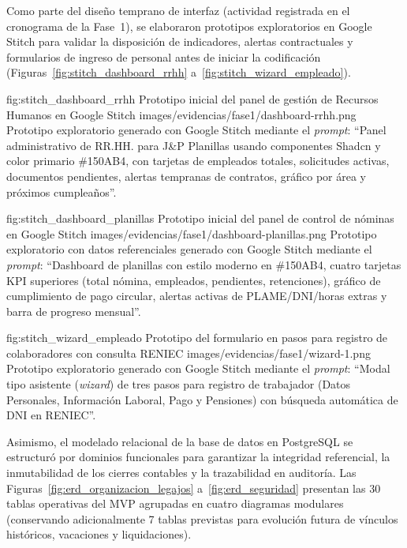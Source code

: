 Como parte del diseño temprano de interfaz (actividad registrada en el cronograma de la Fase~1), 
se elaboraron prototipos exploratorios en Google Stitch para validar la disposición de indicadores, 
alertas contractuales y formularios de ingreso de personal antes de iniciar la codificación 
(Figuras~\ref{fig:stitch_dashboard_rrhh} a~\ref{fig:stitch_wizard_empleado}).

\figuraEnTexto
    {fig:stitch_dashboard_rrhh}
    {Prototipo inicial del panel de gestión de Recursos Humanos en Google Stitch}
    {images/evidencias/fase1/dashboard-rrhh.png}
    {Prototipo exploratorio generado con Google Stitch mediante el \textit{prompt}: 
    ``Panel administrativo de RR.HH. para J\&P Planillas usando componentes Shadcn y color primario \#150AB4, 
    con tarjetas de empleados totales, solicitudes activas, documentos pendientes, alertas tempranas de contratos, gráfico por área y próximos cumpleaños''.}

\figuraEnTexto
    {fig:stitch_dashboard_planillas}
    {Prototipo inicial del panel de control de nóminas en Google Stitch}
    {images/evidencias/fase1/dashboard-planillas.png}
    {Prototipo exploratorio con datos referenciales generado con Google Stitch mediante el \textit{prompt}: 
    ``Dashboard de planillas con estilo moderno en \#150AB4, cuatro tarjetas KPI superiores (total nómina, empleados, pendientes, retenciones), 
    gráfico de cumplimiento de pago circular, alertas activas de PLAME/DNI/horas extras y barra de progreso mensual''.}

\figuraEnTexto
    {fig:stitch_wizard_empleado}
    {Prototipo del formulario en pasos para registro de colaboradores con consulta RENIEC}
    {images/evidencias/fase1/wizard-1.png}
    {Prototipo exploratorio generado con Google Stitch mediante el \textit{prompt}: 
    ``Modal tipo asistente (\textit{wizard}) de tres pasos para registro de trabajador (Datos Personales, Información Laboral, Pago y Pensiones) 
    con búsqueda automática de DNI en RENIEC''.}

Asimismo, el modelado relacional de la base de datos en PostgreSQL 
se estructuró por dominios funcionales para garantizar la integridad referencial, 
la inmutabilidad de los cierres contables y la trazabilidad en auditoría. 
Las Figuras~\ref{fig:erd_organizacion_legajos} a~\ref{fig:erd_seguridad} presentan las 30 tablas operativas del MVP agrupadas en 
cuatro diagramas modulares (conservando adicionalmente 7 tablas previstas para evolución futura de vínculos históricos, vacaciones y liquidaciones).


